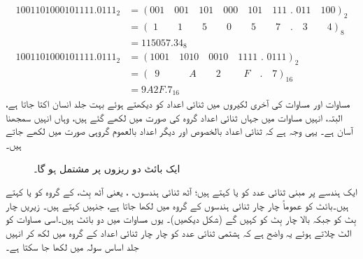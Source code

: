  \begin{align*}
 1001101000101111.0111_2&=(001\quad 001\quad 101\quad 000\quad 101\quad 111\,\, . \,\,011\quad 100)_2\\
 &=(\,\,1\quad \quad 1\quad \quad 5\quad \quad 0 \quad \quad 5\quad \quad 7\quad .\quad 3\quad \quad 4)_8\\
 &=115057.34_8\\
 1001101000101111.0111_2&=(1001\quad 1010\quad 0010\quad 1111\,\, . \,\,0111)_2\\
 &=(\,\,\,9\quad \quad \quad A\quad \quad 2\quad \quad \,\,F \quad . \quad 7)_{16}\\
 &=9A2F.7_{16}
 \end{align*}
	مساوات  اور مساوات  کی آخری لکیروں میں ثنائی اعداد کو دیکھتے ہوئے بہت جلد انسان اکتا جاتا ہے، البتہ، انہیں مساوات میں جہاں ثنائی اعداد گروہ کی صورت میں لکھے گئے ہیں، وہاں انہیں سمجھنا آسان ہے۔ یہی وجہ ہے کہ ثنائی اعداد بالخصوص اور دیگر اعداد بالعموم گروہی صورت میں لکھے جاتے ہیں۔
	
\begin{figure}
\centering
{}
\caption{ایک بائٹ دو ریزوں پر مشتمل ہو گا۔}
\label{شکل_ثنائی_ریزہ}
\end{figure}

ایک ہندسے پر مبنی ثنائی عدد کو  یا   کہتے ہیں؛ آٹھ ثنائی ہندسوں، ، یعنی آٹھ بِٹ، کے گروہ کو  یا   کہتے ہیں۔بائٹ کو عموماً چار چار ثنائی  ہندسوں  کے گروہ میں لکھا جاتا ہے، جنہیں کہتے ہیں۔  زیریں چار بِٹ کو  جبکہ  بالا چار بِٹ کو  کہیں گے (شکل   دیکھیں)۔ یوں مساوات  میں دو بائٹ ہیں۔اسی مساوات کو الٹ چلاتے ہوئے یہ واضح ہے کہ ہشتمی ثنائی عدد کو چار چار ثنائی اعداد کے گروہ میں لکھ کر انہیں جلد اساس سولہ میں لکھا جا سکتا ہے۔

